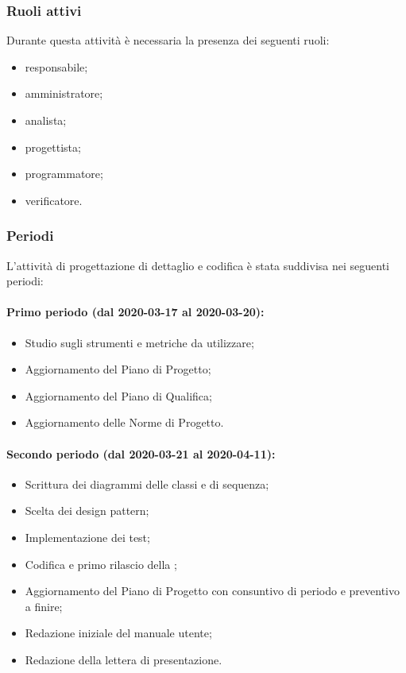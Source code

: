 			\subsubsection{Ruoli attivi}
			
				Durante questa attività è necessaria la presenza dei seguenti ruoli:
				\begin{itemize}
					\item responsabile;
					\item amministratore;
					\item analista;
					\item progettista;
					\item programmatore;
					\item verificatore.
				\end{itemize}
			
			\subsubsection{Periodi}
			
				L'attività di progettazione di dettaglio e codifica è stata suddivisa nei seguenti periodi:
				
				\paragraph{Primo periodo (dal 2020-03-17 al 2020-03-20):}
				
					\begin{itemize}
						\item Studio sugli strumenti e metriche da utilizzare;
					 	\item Aggiornamento del Piano di Progetto;
					 	\item Aggiornamento del Piano di Qualifica;
					 	\item Aggiornamento delle Norme di Progetto.
					\end{itemize} 	
				
				\paragraph{Secondo periodo (dal 2020-03-21 al 2020-04-11):}
				
					\begin{itemize}
						\item Scrittura dei diagrammi delle classi e di sequenza;
						\item Scelta dei design pattern;
						\item Implementazione dei test;
						\item Codifica e primo rilascio della ;
						\item Aggiornamento del Piano di Progetto con consuntivo di periodo e preventivo a finire;
						\item Redazione iniziale del manuale utente;
						\item Redazione della lettera di presentazione.
					\end{itemize}
		
